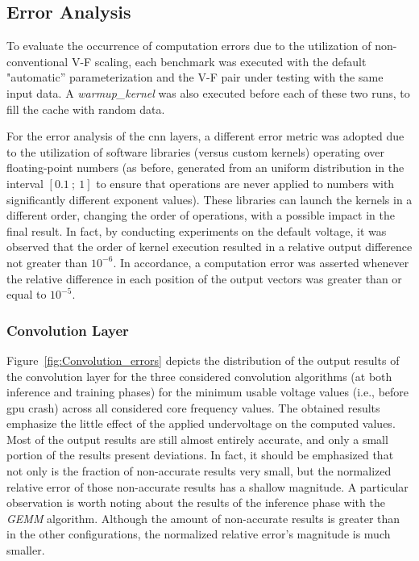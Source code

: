 \subsection{Error Analysis}

To evaluate the occurrence of computation errors due to the utilization of non-conventional V-F scaling, each benchmark was executed with the default "automatic'' parameterization and the V-F pair under testing with the same input data. A \textit{warmup\_kernel} was also executed before each of these two runs, to fill the cache with random data. 


For the error analysis of the \acrshort{cnn} layers, a different error metric was adopted due to the utilization of software libraries (versus custom kernels) operating over floating-point numbers (as before, generated from an uniform distribution in the interval $[0.1~;~1]$ to ensure that operations are never applied to numbers with significantly different exponent values). These libraries can launch the kernels in a different order, changing the order of operations, with a possible impact in the final result. In fact, by conducting experiments on the default voltage, it was observed that the order of kernel execution resulted in a relative output difference not greater than $10^{-6}$. In accordance, a computation error was asserted whenever the relative difference in each position of the output vectors was greater than or equal to  $10^{-5}$.

\subsubsection{Convolution Layer}

Figure~\ref{fig:Convolution_errors} depicts the distribution of the output results of the convolution layer for the three considered convolution algorithms (at both inference and training phases) for the minimum usable voltage values (i.e., before \acrshort{gpu} crash) across all considered core frequency values. The obtained results emphasize the little effect of the applied undervoltage on the computed values. Most of the output results are still almost entirely accurate, and only a small portion of the results present deviations. In fact, it should be emphasized that not only is the fraction of non-accurate results very small, but the normalized relative error of those non-accurate results has a shallow magnitude. A particular observation is worth noting about the results of the inference phase with the \textit{GEMM} algorithm. Although the amount of non-accurate results is greater than in the other configurations, the normalized relative error's magnitude is much smaller.

